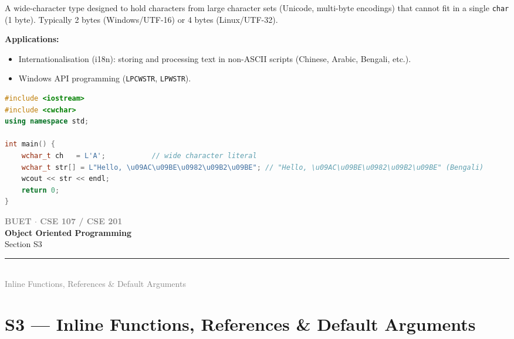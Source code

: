 \documentclass[12pt,a3paper]{article}
\newcommand{\secdivider}[4]{%
  \newpage\thispagestyle{empty}%
  \vspace*{\fill}%
  \begin{tcolorbox}[enhanced,colback=#4!7,colframe=#3,boxrule=1.5pt,arc=8pt,
    left=20pt,right=20pt,top=22pt,bottom=22pt,
    shadow={3pt}{-3pt}{0pt}{black!15}]
    \centering
    {\large\textcolor{gray}{\textbf{BUET $\cdot$ CSE 107 / CSE 201}}}\\[8pt]
    {\fontsize{26}{32}\selectfont\bfseries\textcolor{#3}{Object Oriented Programming}}\\[6pt]
    {\fontsize{15}{19}\selectfont\textcolor{dgray}{#1}}\\[12pt]
    \textcolor{#3!60}{\rule{0.5\textwidth}{0.5pt}}\\[6pt]
    {\small\textcolor{gray}{#2}}
  \end{tcolorbox}%
  \vspace*{\fill}\newpage%
}
\begin{document}
\begin{enumerate}
\begin{tcolorbox}[enhanced,breakable,ansbox,colback=cB!4,colframe=cB,
  boxrule=0.8pt,arc=5pt,
  title={\textbf{Answer}},fonttitle=\bfseries\color{white},colbacktitle=cB]
A wide-character type designed to hold characters from large
character sets (Unicode, multi-byte encodings) that cannot fit in a
single \texttt{char} (1 byte).  Typically 2 bytes (Windows/UTF-16)
or 4 bytes (Linux/UTF-32).

\textbf{Applications:}
\begin{itemize}[itemsep=2pt]
  \item Internationalisation (i18n): storing and processing text in
    non-ASCII scripts (Chinese, Arabic, Bengali, etc.).
  \item Windows API programming (\texttt{LPCWSTR}, \texttt{LPWSTR}).
\end{itemize}

\begin{lstlisting}[language=C++]
#include <iostream>
#include <cwchar>
using namespace std;

int main() {
    wchar_t ch   = L'A';           // wide character literal
    wchar_t str[] = L"Hello, \u09AC\u09BE\u0982\u09B2\u09BE"; // "Hello, \u09AC\u09BE\u0982\u09B2\u09BE" (Bengali)
    wcout << str << endl;
    return 0;
}
\end{lstlisting}

\end{tcolorbox}





\end{enumerate}
\newpage

\secdivider{Section S3}{Inline Functions, References \& Default Arguments}{cC}{cC}
\label{sec:S3}
\titleformat{\section}{\large\bfseries\color{cC}}{}{0em}{}[\titlerule]
\section{S3 --- Inline Functions, References \& Default Arguments}
\end{document}
